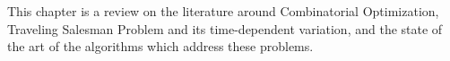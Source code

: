 This chapter is a review on the literature around Combinatorial Optimization,
Traveling Salesman Problem and its time-dependent variation,
and the state of the art of the algorithms which address these problems.
